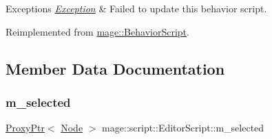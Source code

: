 \begin{DoxyExceptions}{Exceptions}
{\em \hyperlink{classmage_1_1_exception}{Exception}} & Failed to update this behavior script. \\
\hline
\end{DoxyExceptions}


Reimplemented from \hyperlink{classmage_1_1_behavior_script_a085634661326b59850c1111e537baa4e}{mage\+::\+Behavior\+Script}.



\subsection{Member Data Documentation}
\hypertarget{classmage_1_1script_1_1_editor_script_a60a8044379dfd203ad372dabb5c03380}{}\label{classmage_1_1script_1_1_editor_script_a60a8044379dfd203ad372dabb5c03380} 
\subsubsection{\texorpdfstring{m\+\_\+selected}{m\_selected}}
{\footnotesize\ttfamily \hyperlink{classmage_1_1_proxy_ptr}{Proxy\+Ptr}$<$ \hyperlink{classmage_1_1_node}{Node} $>$ mage\+::script\+::\+Editor\+Script\+::m\+\_\+selected\hspace{0.3cm}{\ttfamily [private]}}

